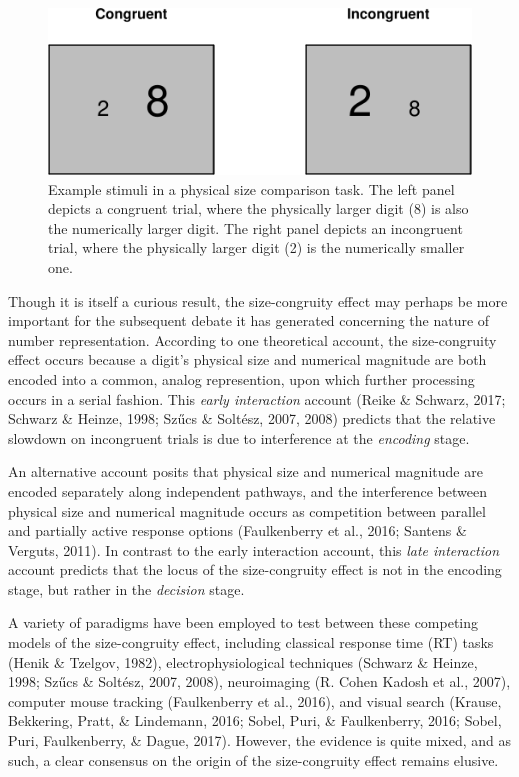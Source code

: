 \documentclass[english,man]{apa6}
\theoremstyle{definition}
\theoremstyle{definition}
\theoremstyle{definition}
\theoremstyle{remark}
\begin{document}
\begin{figure}
\centering
\includegraphics{paper_files/figure-latex/sceFigure-1.pdf}
\caption{\label{fig:sceFigure}Example stimuli in a physical size comparison
task. The left panel depicts a congruent trial, where the physically
larger digit (8) is also the numerically larger digit. The right panel
depicts an incongruent trial, where the physically larger digit (2) is
the numerically smaller one.}
\end{figure}

Though it is itself a curious result, the size-congruity effect may
perhaps be more important for the subsequent debate it has generated
concerning the nature of number representation. According to one
theoretical account, the size-congruity effect occurs because a digit's
physical size and numerical magnitude are both encoded into a common,
analog represention, upon which further processing occurs in a serial
fashion. This \emph{early interaction} account (Reike \& Schwarz, 2017;
Schwarz \& Heinze, 1998; Szűcs \& Soltész, 2007, 2008) predicts that the
relative slowdown on incongruent trials is due to interference at the
\emph{encoding} stage.

An alternative account posits that physical size and numerical magnitude
are encoded separately along independent pathways, and the interference
between physical size and numerical magnitude occurs as competition
between parallel and partially active response options (Faulkenberry et
al., 2016; Santens \& Verguts, 2011). In contrast to the early
interaction account, this \emph{late interaction} account predicts that
the locus of the size-congruity effect is not in the encoding stage, but
rather in the \emph{decision} stage.

A variety of paradigms have been employed to test between these
competing models of the size-congruity effect, including classical
response time (RT) tasks (Henik \& Tzelgov, 1982), electrophysiological
techniques (Schwarz \& Heinze, 1998; Szűcs \& Soltész, 2007, 2008),
neuroimaging (R. Cohen Kadosh et al., 2007), computer mouse tracking
(Faulkenberry et al., 2016), and visual search (Krause, Bekkering,
Pratt, \& Lindemann, 2016; Sobel, Puri, \& Faulkenberry, 2016; Sobel,
Puri, Faulkenberry, \& Dague, 2017). However, the evidence is quite
mixed, and as such, a clear consensus on the origin of the
size-congruity effect remains elusive.
\end{document}
